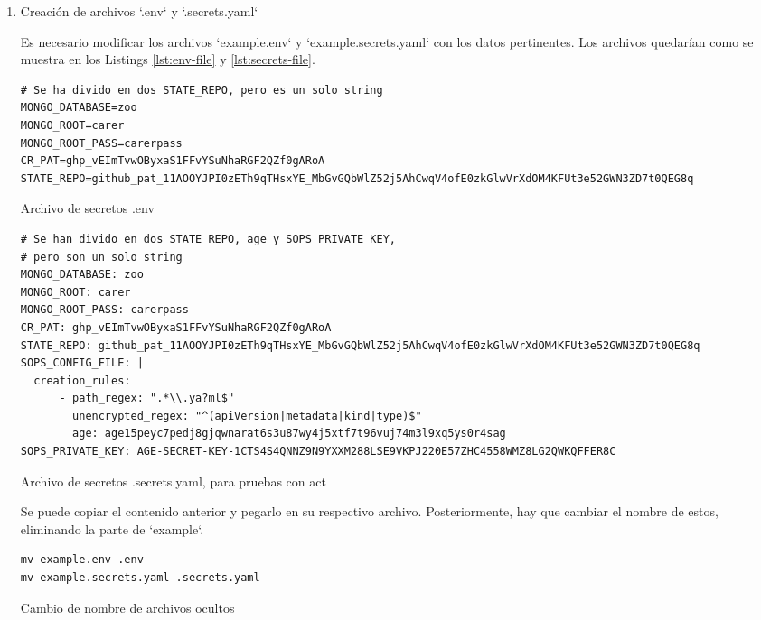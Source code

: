 \begin{enumerate}
  \item Creación de archivos `.env` y `.secrets.yaml`

    Es necesario modificar los archivos `example.env` y `example.secrets.yaml` con los datos pertinentes. Los archivos quedarían como se muestra en los Listings \ref{lst:env-file} y \ref{lst:secrets-file}.
  
\begin{listing}[!ht]
  \begin{verbatim}
# Se ha divido en dos STATE_REPO, pero es un solo string
MONGO_DATABASE=zoo
MONGO_ROOT=carer
MONGO_ROOT_PASS=carerpass
CR_PAT=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
STATE_REPO=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
\end{verbatim}
\caption{Archivo de secretos .env}
\label{lst:env-file}
\end{listing}

\begin{listing}[!ht]
  \begin{verbatim}
# Se han divido en dos STATE_REPO, age y SOPS_PRIVATE_KEY,
# pero son un solo string
MONGO_DATABASE: zoo
MONGO_ROOT: carer
MONGO_ROOT_PASS: carerpass
CR_PAT: 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
STATE_REPO: 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
SOPS_CONFIG_FILE: |
  creation_rules:
      - path_regex: ".*\\.ya?ml$"
        unencrypted_regex: "^(apiVersion|metadata|kind|type)$"
        age: age15peyc7pedj8gjqwnarat6s3u87wy4j5xtf7t96vuj74m3l9xq5ys0r4sag
SOPS_PRIVATE_KEY: AGE-SECRET-KEY-1CTS4S4QNNZ9N9YXXM288LSE9VKPJ220E57ZHC4558WMZ8LG2QWKQFFER8C
\end{verbatim}
\caption{Archivo de secretos .secrets.yaml, para pruebas con act}
\label{lst:secrets-file}
\end{listing}

    Se puede copiar el contenido anterior y pegarlo en su respectivo archivo. Posteriormente, hay que cambiar el nombre de estos, eliminando la parte de `example`.

\begin{listing}[!ht]
  \begin{verbatim}
mv example.env .env
mv example.secrets.yaml .secrets.yaml
\end{verbatim}
\caption{Cambio de nombre de archivos ocultos}
\end{listing}


\end{enumerate}
